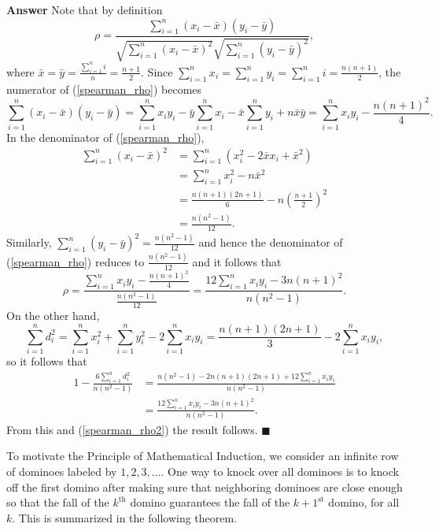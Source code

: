 \documentclass[12pt,letterpaper]{book}
\numberwithin{equation}{section}
\theoremstyle{definition}
\newenvironment{answer}{\noindent\textbf{Answer}}{\hfill$\blacksquare$\vspace{0.1in}}
\begin{document}
\begin{answer}
Note that by definition 
\begin{equation}\label{spearman_rho}\rho=\frac{\sum_{i=1}^n(x_i-\bar{x})(y_i-\bar{y})}{\sqrt{\sum_{i=1}^n(x_i-\bar{x})^2}\sqrt{\sum_{i=1}^n(y_i-\bar{y})^2}},\end{equation}
where $\bar{x}=\bar{y}=\frac{\sum_{i=1}^n i}{n}=\frac{n+1}{2}$.
Since $\sum_{i=1}^n x_i=\sum_{i=1}^n y_i=\sum_{i=1}^n i=\frac{n(n+1)}{2}$, the numerator of (\ref{spearman_rho}) becomes
$$\sum_{i=1}^n(x_i-\bar{x})(y_i-\bar{y})=\sum_{i=1}^n x_iy_i -\bar{y}\sum_{i=1}^n x_i -\bar{x}\sum_{i=1}^n y_i +n \bar{x}\bar{y}=\sum_{i=1}^n x_iy_i-\frac{n(n+1)^2}{4}.$$
In the denominator of (\ref{spearman_rho}), 
\begin{align*}
\sum_{i=1}^n(x_i-\bar{x})^2&=\sum_{i=1}^n(x_i^2-2\bar{x}x_i+\bar{x}^2)\\
&=\sum_{i=1}^n x_i^2-n\bar{x}^2\\
&=\frac{n(n+1)(2n+1)}{6}-n\left(\frac{n+1}{2}\right)^2\\
&=\frac{n(n^2-1)}{12}.
\end{align*}
Similarly, $\sum_{i=1}^n(y_i-\bar{y})^2=\frac{n(n^2-1)}{12}$ and hence the denominator of (\ref{spearman_rho}) reduces to $\frac{n(n^2-1)}{12}$ and it follows that
\begin{equation}\label{spearman_rho2}\rho=\frac{\sum_{i=1}^n x_iy_i-\frac{n(n+1)^2}{4}}{\frac{n(n^2-1)}{12}}=\frac{12\sum_{i=1}^n x_iy_i-3n(n+1)^2}{n(n^2-1)}.\end{equation}
On the other hand,
$$\sum_{i=1}^n d_i^2=\sum_{i=1}^n x_i^2 + \sum_{i=1}^n y_i^2 -2\sum_{i=1}^n x_iy_i=\frac{n(n+1)(2n+1)}{3}-2\sum_{i=1}^n x_iy_i,$$
so it follows that
\begin{align*}
1-\frac{6\sum_{i=1}^n d_i^2}{n(n^2-1)}&=\frac{n(n^2-1)-2n(n+1)(2n+1)+12\sum_{i=1}^n x_iy_i}{n(n^2-1)}\\
&=\frac{12\sum_{i=1}^n x_iy_i-3n(n+1)^2}{n(n^2-1)}.
\end{align*}
From this and (\ref{spearman_rho2}) the result follows.
\end{answer}

To motivate the Principle of Mathematical Induction, we consider an infinite row of dominoes labeled by $1,2,3,\ldots$. One way to knock over all dominoes is to knock off the first domino after making sure that neighboring dominoes are close enough so that the fall of the $k^{\text{th}}$ domino guarantees the fall of the $k+1^{\text{st}}$ domino, for all $k$. This is summarized in the following theorem.
\end{document}
